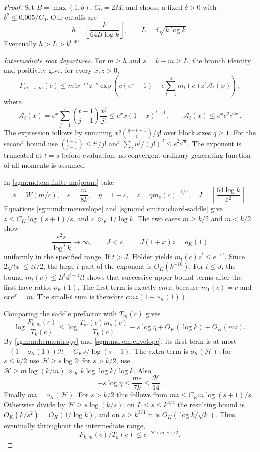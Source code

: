 \documentclass[11pt,letterpaper]{article}
\theoremstyle{remark}\newtheorem{remark}[theorem]{Remark}
\theoremstyle{definition}\newtheorem{definition}[theorem]{Definition}
\begin{document}
\begin{proof}
Set \(B=\max(1,b)\), \(C_0=2M\), and choose a fixed
\(\delta>0\) with \(\delta^2\le0.005/C_0\). Our cutoffs are
\[
 h=\left\lfloor\frac{k}{64B\log k}\right\rfloor,\qquad
 L=\delta\sqrt{k\log k}.
\]
Eventually \(h>L>k^{0.49}\).

\emph{Intermediate root departures.}
For \(m\ge h\) and \(s=k-m\ge L\), the branch identity and positivity
give, for every \(x,z>0\),
\begin{equation}\label{sgm:md:cm:finite-majorant}
 F_{m+s,m}(c)\le m!x^{-m}z^{-s}
 \exp\left(c(e^x-1)+c\sum_{t=1}^{s}m_t(c)z^t
                         \mathcal A_t(x)\right),
\end{equation}
where
\[
 \mathcal A_t(x)=
 e^x\sum_{j=1}^{t}\binom{t-1}{j-1}\frac{x^j}{j!}
 \le e^xx(1+x)^{t-1},\qquad
 \mathcal A_t(x)\le e^xe^{2\sqrt{tx}}.
\]
The expression follows by summing
\(x^q\binom{q+t-1}{t}/q!\) over block sizes \(q\ge1\).
For the second bound use
\(\binom{t-1}{j-1}\le t^j/j!\) and
\(\sum_j u^j/(j!)^2\le e^{2\sqrt u}\).
The exponent is truncated at \(t=s\) before evaluation; no convergent
ordinary generating function of all moments is assumed.

In \eqref{sgm:md:cm:finite-majorant} take
\[
 x=W(m/c),\quad
 \varepsilon=\frac{m}{8k},\quad \eta=1-\varepsilon,\quad
 z=\eta m_s(c)^{-1/s},\quad
 J=\left\lceil\frac{64\log k}{\varepsilon^2}\right\rceil .
\]
Equations \eqref{sgm:md:cm:envelope} and \eqref{sgm:md:cm:touchard-saddle}
give \(z\le C_K\log(s+1)/s\), and
\(\varepsilon\gg_K1/\log k\).
The two cases \(m\ge k/2\) and \(m<k/2\) show
\[
 \frac{\varepsilon^2s}{\log^3k}\longrightarrow\infty,\qquad
 J<s,\qquad J(1+x)z=o_K(1)
\]
uniformly in the specified range. If \(t>J\), H\"older yields
\(m_t(c)z^t\le e^{-\varepsilon t}\).
Since \(2\sqrt{tx}\le\varepsilon t/2\), the large-\(t\) part of the
exponent is \(O_K(k^{-10})\).
For \(t\le J\), the bound
\(m_t(c)\le B^t4^{t-1}t!\) shows that successive upper-bound terms
after the first have ratios \(o_K(1)\).
The first term is exactly \(cmz\), because
\(m_1(c)=c\) and \(cxe^x=m\).
The small-\(t\) sum is therefore \(cmz(1+o_K(1))\).

Comparing the saddle prefactor with \(T_m(c)\) gives
\[
 \log\frac{F_{k,m}(c)}{T_k(c)}
 \le\log\frac{T_m(c)m_s(c)}{T_k(c)}
       -s\log\eta+O_K(\log k)+O_K(mz).
\]
By \eqref{sgm:md:cm:entropy} and \eqref{sgm:md:cm:envelope}, its first term is
at most \(-(1-o_K(1))\mathcal H+C_Ks/\log(s+1)\).
The extra term is \(o_K(\mathcal H)\): for \(s\le k/2\) use
\(\mathcal H\ge s\log2\); for \(s>k/2\), use
\(\mathcal H\ge m\log(k/m)\gg_K k\log\log k/\log k\).
Also
\[
 -s\log\eta\le\frac{ms}{7k}\le\frac{\mathcal H}{14}.
\]
Finally \(mz=o_K(\mathcal H)\). For \(s>k/2\) this follows from
\(mz\le C_Km\log(s+1)/s\). Otherwise divide by
\(\mathcal H\ge s\log(k/s)\); on \(L\le s\le k^{3/4}\)
the resulting bound is \(O_K(k/s^2)=O_K(1/\log k)\), and on
\(s\ge k^{3/4}\) it is \(O_K(\log k/\sqrt k)\).
Thus, eventually throughout the intermediate range,
\begin{equation}\label{sgm:md:cm:intermediate}
 F_{k,m}(c)/T_k(c)\le e^{-\mathcal H(m,s)/2}.
\end{equation}


\end{proof}
\end{document}
